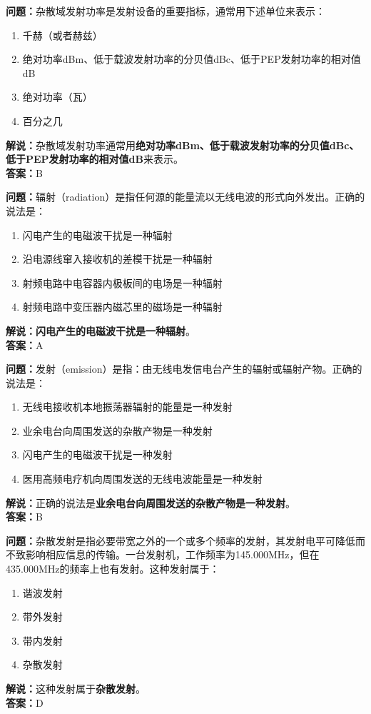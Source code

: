\bigskip


\noindent\textbf{问题：}杂散域发射功率是发射设备的重要指标，通常用下述单位来表示：
\begin{enumerate}[label=\Alph*), leftmargin=3em]
	\item 千赫（或者赫兹）
	\item 绝对功率dBm、低于载波发射功率的分贝值dBc、低于PEP发射功率的相对值dB
	\item 绝对功率（瓦）
	\item 百分之几
\end{enumerate}
\noindent\textbf{解说：}杂散域发射功率通常用\textbf{绝对功率dBm、低于载波发射功率的分贝值dBc、低于PEP发射功率的相对值dB}来表示。\\\noindent\textbf{答案：}B


\bigskip


\noindent\textbf{问题：}辐射（radiation）是指任何源的能量流以无线电波的形式向外发出。正确的说法是：
\begin{enumerate}[label=\Alph*), leftmargin=3em]
	\item 闪电产生的电磁波干扰是一种辐射
	\item 沿电源线窜入接收机的差模干扰是一种辐射
	\item 射频电路中电容器内极板间的电场是一种辐射
	\item 射频电路中变压器内磁芯里的磁场是一种辐射
\end{enumerate}
\textbf{解说：闪电产生的电磁波干扰是一种辐射}。\\\noindent\textbf{答案：}A



\bigskip


\noindent\textbf{问题：}发射（emission）是指：由无线电发信电台产生的辐射或辐射产物。正确的说法是：
\begin{enumerate}[label=\Alph*), leftmargin=3em]
	\item 无线电接收机本地振荡器辐射的能量是一种发射
	\item 业余电台向周围发送的杂散产物是一种发射
	\item 闪电产生的电磁波干扰是一种发射
	\item 医用高频电疗机向周围发送的无线电波能量是一种发射
\end{enumerate}
\noindent\textbf{解说：}正确的说法是\textbf{业余电台向周围发送的杂散产物是一种发射}。\\\noindent\textbf{答案：}B


\bigskip


\noindent\textbf{问题：}杂散发射是指必要带宽之外的一个或多个频率的发射，其发射电平可降低而不致影响相应信息的传输。一台发射机，工作频率为145.000MHz，但在435.000MHz的频率上也有发射。这种发射属于：
\begin{enumerate}[label=\Alph*), leftmargin=3em]
	\item 谐波发射
	\item 带外发射
	\item 带内发射
	\item 杂散发射
\end{enumerate}
\noindent\textbf{解说：}这种发射属于\textbf{杂散发射}。\\\noindent\textbf{答案：}D




